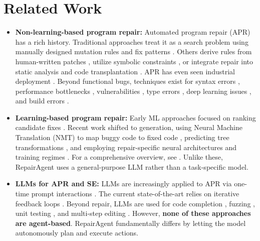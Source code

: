 \documentclass[manuscript,review]{acmart}
\begin{document}
\section{Related Work}

\begin{itemize}
    \item \textbf{Non-learning-based program repair:} Automated program repair (APR) \cite{legoues2019automated} has a rich history. Traditional approaches treat it as a search problem using manually designed mutation rules and fix patterns \cite{legoues2012genprog, le2016history, liu2019tbar}. Others derive rules from human-written patches \cite{kim2013automatic, bader2019getafix, bavishi2019phoenix}, utilize symbolic constraints \cite{nguyen2013semfix, ke2015repairing, xuan2016nopol, mechtaev2016angelix}, or integrate repair into static analysis \cite{tonder2018static, liu2023program, jain2023staticfixer} and code transplantation \cite{yang2022transplantfix}. APR has even seen industrial deployment \cite{bader2019getafix, marginean2019sapfix}. Beyond functional bugs, techniques exist for syntax errors \cite{wang2018search, gupta2019deep, sakkas2022seq2parse}, performance bottlenecks \cite{yu2017pinpointing}, vulnerabilities \cite{harer2018learning}, type errors \cite{chow2024pyty}, deep learning issues \cite{zhang2021autotrainer}, and build errors \cite{tarlow2020learning}.
    
    \item \textbf{Learning-based program repair:} Early ML approaches focused on ranking candidate fixes \cite{long2016automatic}. Recent work shifted to generation, using Neural Machine Translation (NMT) to map buggy code to fixed code \cite{gupta2017deepfix, tufano2019learning, lutellier2020coconut, chen2021sequencer}, predicting tree transformations \cite{li2020dlfix, zhu2021syntax}, and employing repair-specific neural architectures and training regimes \cite{vasic2019neural, ye2022neural, ye2022selfapr}. For a comprehensive overview, see \cite{zhang2023survey}. Unlike these, RepairAgent uses a general-purpose LLM rather than a task-specific model.
    
    \item \textbf{LLMs for APR and SE:} LLMs are increasingly applied to APR via one-time prompt interactions \cite{jiang2023impact, xia2023automated, joshi2023repair}. The current state-of-the-art relies on iterative feedback loops \cite{xia2023keep, kang2023explainable, ye2024iter, hidvegi2024cigar}. Beyond repair, LLMs are used for code completion \cite{chen2021evaluating, shrivastava2023repository}, fuzzing \cite{xia2024fuzz4all}, unit testing \cite{lemieux2023codamosa, schafer2024empirical, ryan2024code, alshahwan2024automated, kang2023large, feng2024prompting}, and multi-step editing \cite{bairi2023codeplan}. However, \textbf{none of these approaches are agent-based}. RepairAgent fundamentally differs by letting the model autonomously plan and execute actions.
    

\end{itemize}
\end{document}
